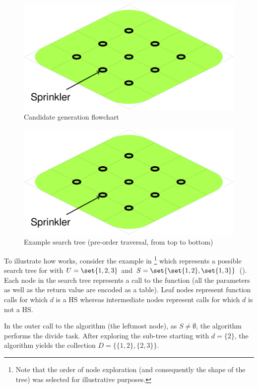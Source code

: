 \begin{figure}[!ht]
  \includegraphics[scale=0.9,page=14]{figures/introduction/figures/main.pdf}
  \caption{Candidate generation flowchart\label{fig:intro:cg-flowchart} }
\end{figure}


\begin{figure}[!ht]
  \includegraphics[page=8]{figures/introduction/figures/main.pdf}
  \caption{Example search tree (pre-order traversal, from top to bottom)}
  \label{fig:intro:staccato-search-tree}
\end{figure}


To illustrate how \staccato{} works, consider the example in
\footnote{Note that the order of
  node exploration (and consequently the shape of the tree) was
  selected for illustrative purposes.} which represents a possible
search tree for \staccato{} with $U = \set{1,2,3}$ and $S =
\set{\set{1,2}, \set{1,3}}$ ().
%
Each node in the search tree represents a call to the function (all
the parameters as well as the return value are encoded as a table).
%
Leaf nodes represent function calls for which $d$ is a \ac{HS} whereas
intermediate nodes represent calls for which $d$ is not a \ac{HS}.


In the outer call to the algorithm (the leftmost node), as
$S \not= \emptyset$, the algorithm performs the divide task.
%
After exploring the sub-tree starting with $d=\{2\}$,
the algorithm yields the collection $D=\{\{1,2\},\{2,3\}\}$.


